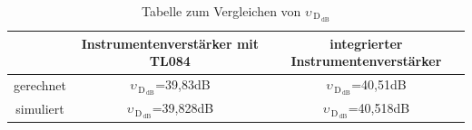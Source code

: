  \begin{table}[h!]
            \centering
            \caption{Tabelle zum Vergleichen von $\upsilon_{\,\text{D}_{\,\text{dB}}}$}
            \begin{tabular}{| c | c | c |} 
            \hline
                
                & Instrumentenverstärker mit TL084 &  integrierter Instrumentenverstärker \\
                \hline\hline
              gerechnet & $\upsilon_{\,\text{D}_{\,\text{dB}}}$=39,83dB & $\upsilon_{\,\text{D}_{\,\text{dB}}}$=40,51dB  \\ 
                \hline
              simuliert & $\upsilon_{\,\text{D}_{\,\text{dB}}}$=39,828dB & $\upsilon_{\,\text{D}_{\,\text{dB}}}$=40,518dB  \\
                \hline
            \end{tabular}
            \label{tab:frequenz}
        \end{table}